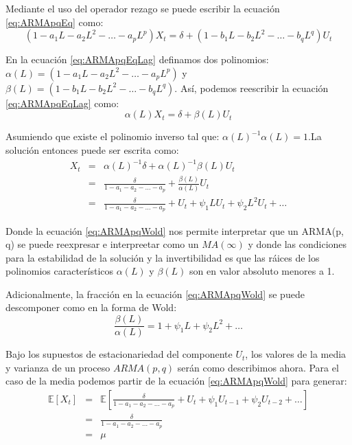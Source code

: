 \documentclass[
]{book}
\begin{document}
Mediante el uso del operador rezago se puede escribir la ecuación \eqref{eq:ARMApqEq} como:
\begin{equation}
    (1 - a_1 L - a_2 L^2 - \ldots - a_p L^p) X_t = \delta + (1 - b_1 L - b_2 L^2 - \ldots - b_q L^q) U_t 
    \label{eq:ARMApqEqLag}
\end{equation}

En la ecuación \eqref{eq:ARMApqEqLag} definamos dos polinomios: \(\alpha(L) = (1 - a_1 L - a_2 L^2 - \ldots - a_p L^p)\) y \(\beta(L) = (1 - b_1 L - b_2 L^2 - \ldots - b_q L^q)\). Así, podemos reescribir la ecuación \eqref{eq:ARMApqEqLag} como:
\begin{equation}
    \alpha(L) X_t = \delta + \beta(L) U_t 
\end{equation}

Asumiendo que existe el polinomio inverso tal que: \(\alpha(L)^{-1}\alpha(L) = 1\).La solución entonces puede ser escrita como:
\begin{eqnarray}
    X_t & = & \alpha(L)^{-1} \delta + \alpha(L)^{-1} \beta(L) U_t \nonumber \\
    & = & \frac{\delta}{1 - a_1 - a_2 - \ldots - a_p} + \frac{\beta(L)}{\alpha(L)} U_t \nonumber \\
    & = & \frac{\delta}{1 - a_1 - a_2 - \ldots - a_p} + U_t + \psi_1 L U_t + \psi_2 L^2 U_t + \ldots
    \label{eq:ARMApqWold}
\end{eqnarray}

Donde la ecuación \eqref{eq:ARMApqWold} nos permite interpretar que un ARMA(p, q) se puede reexpresar e interpreetar como un \(MA(\infty)\) y donde las condiciones para la estabilidad de la solución y la invertibilidad es que las ráices de los polinomios característicos \(\alpha(L)\) y \(\beta(L)\) son en valor absoluto menores a 1.

Adicionalmente, la fracción en la ecuación \eqref{eq:ARMApqWold} se puede descomponer como en la forma de Wold:
\begin{equation}
    \frac{\beta(L)}{\alpha(L)} = 1 + \psi_1 L + \psi_2 L^2 + \ldots
\end{equation}

Bajo los supuestos de estacionariedad del componente \(U_t\), los valores de la media y varianza de un proceso \(ARMA(p, q)\) serán como describimos ahora. Para el caso de la media podemos partir de la ecuación \eqref{eq:ARMApqWold} para generar:
\begin{eqnarray}
    \mathbb{E}[X_t] & = & \mathbb{E}\left[ \frac{\delta}{1 - a_1 - a_2 - \ldots - a_p} + U_t + \psi_1 U_{t-1} + \psi_2 U_{t-2} + \ldots \right] \nonumber \\
    & = & \frac{\delta}{1 - a_1 - a_2 - \ldots - a_p} \nonumber \\
    & = & \mu
\end{eqnarray}
\end{document}
